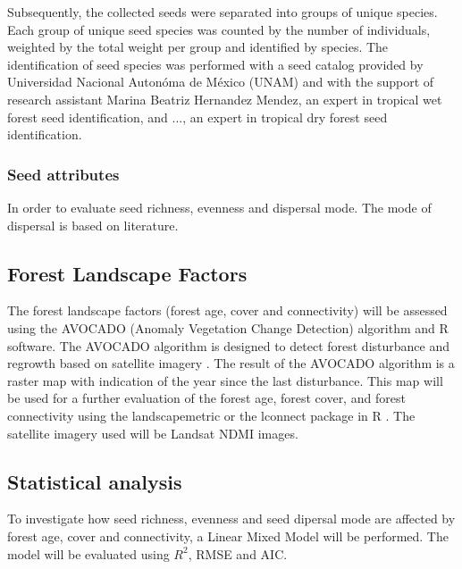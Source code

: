 Subsequently, the collected seeds were separated into groups of unique species. Each group of unique seed species  was counted by the number of individuals, weighted by the total weight per group and identified by species. The identification of seed species was performed with a seed catalog provided by Universidad Nacional Autonóma de México (UNAM) and with the support of research assistant Marina Beatriz Hernandez Mendez, an expert in tropical wet forest seed identification, and ..., an expert in tropical dry forest seed identification. 

\subsubsection{Seed attributes}
In order to evaluate seed richness, evenness and dispersal mode. The mode of dispersal is based on literature.


\subsection{Forest Landscape Factors}
The forest landscape factors (forest age, cover and connectivity) will be assessed using the AVOCADO (Anomaly Vegetation Change Detection) algorithm and R software. The AVOCADO algorithm is designed to detect forest disturbance and regrowth based on satellite imagery \citep{decuyperContinuousMonitoringForest2022}. The result of the AVOCADO algorithm is a raster map with indication of the year since the last disturbance. This map will be used for a further evaluation of the forest age, forest cover, and forest connectivity using the landscapemetric or the lconnect package in R \citep{mestreLconnectPackageVersatile2023, hesselbarthLandscapemetricsOpensourceTool2019}. The satellite imagery used will be Landsat NDMI images. 

\subsection{Statistical analysis}
To investigate how seed richness, evenness and seed dipersal mode are affected by forest age, cover and connectivity, a Linear Mixed Model will be performed. The model will be evaluated using $R^2$, RMSE and AIC.

 